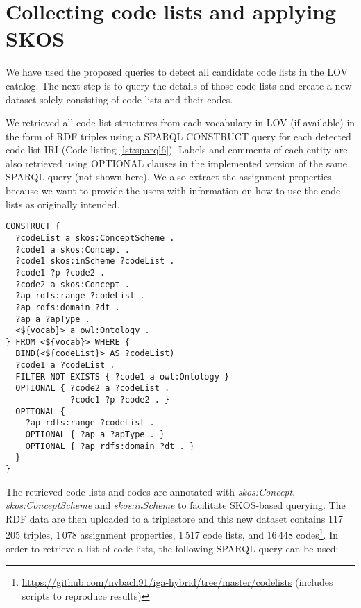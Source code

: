 \section{Collecting code lists and applying SKOS}
\label{s:skos_codelist_collecting}
We have used the proposed queries to detect all candidate code lists in the LOV catalog. The next step is to query the details of those code lists and create a new dataset solely consisting of code lists and their codes.

We retrieved all code list structures from each vocabulary in LOV (if available) in the form of RDF triples using a SPARQL CONSTRUCT query for each detected code list IRI (Code listing \ref{lst:sparql6}). %
Labels and comments of each entity are also retrieved using OPTIONAL clauses in the implemented version of the same SPARQL query (not shown here). We also extract the assignment properties because we want to provide the users with information on how to use the code lists as originally intended.

\medskip
\medskip
\medskip

\begin{lstlisting}[captionpos=b, caption=Query to gather all code lists and annotate them with SKOS,label=lst:sparql6,basicstyle=\small\ttfamily,frame=single]
CONSTRUCT {
  ?codeList a skos:ConceptScheme .
  ?code1 a skos:Concept . 
  ?code1 skos:inScheme ?codeList .
  ?code1 ?p ?code2 .
  ?code2 a skos:Concept .
  ?ap rdfs:range ?codeList . 
  ?ap rdfs:domain ?dt .
  ?ap a ?apType .
  <${vocab}> a owl:Ontology .
} FROM <${vocab}> WHERE {
  BIND(<${codeList}> AS ?codeList)
  ?code1 a ?codeList .
  FILTER NOT EXISTS { ?code1 a owl:Ontology }
  OPTIONAL { ?code2 a ?codeList .
             ?code1 ?p ?code2 . }
  OPTIONAL {
    ?ap rdfs:range ?codeList . 
    OPTIONAL { ?ap a ?apType . }
    OPTIONAL { ?ap rdfs:domain ?dt . }
  }
}
\end{lstlisting}

The retrieved code lists and codes are annotated with \textit{skos:Concept}, \textit{skos:ConceptScheme} and \textit{skos:inScheme} to facilitate SKOS-based querying. The RDF data are then uploaded to a triplestore and this new dataset contains 117\,205 triples, 1\,078 assignment properties, 1\,517 code lists, and 16\,448 codes\footnote{\url{https://github.com/nvbach91/iga-hybrid/tree/master/codelists} (includes scripts to reproduce results)}. In order to retrieve a list of code lists, the following SPARQL query can be used:

